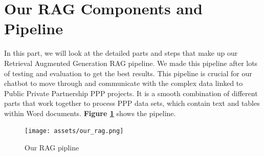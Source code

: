 \section{Our RAG Components and Pipeline}
In this part, we will look at the detailed parts and steps that make up our Retrieval Augmented Generation RAG pipeline. We made this pipeline after lots of testing and evaluation to get the best results. This pipeline is crucial for our chatbot to move through and communicate with the complex data linked to Public Private Partnership PPP projects. It is a smooth combination of different parts that work together to process PPP data sets, which contain text and tables within Word documents. \textbf{Figure \ref{fig:our_rag}} shows the pipeline.
\begin{figure}[H]
    \centering
    \texttt{[image: assets/our\_rag.png]}
    \caption{Our RAG pipline}
    \label{fig:our_rag}
\end{figure}

